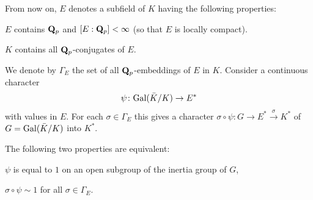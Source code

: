 
From now on, $E$ denotes a subfield of $K$ having the following
properties:
\begin{alist}
\item $E$ contains $\mathbf{Q}_p$ and $[E:\mathbf{Q}_p]<\infty$ (so that $E$ is locally
compact).
\item $K$ contains all $\mathbf{Q}_p$-conjugates of $E$.
\end{alist}
We denote by $\Gamma_E$ the set of all $\mathbf{Q}_p$-embeddings of $E$ in $K$.
Consider a continuous character
\[
\psi\colon\mathrm{Gal}(\bar K/K)\to E^*
\]
with values in $E$.  For each $\sigma\in\Gamma_E$ this gives a
character $\sigma\circ\psi\colon G\to E^*\xrightarrow{\ \sigma\ } K^*$
of $G=\mathrm{Gal}(\bar K/K)$ into $K^*$.

\begin{proposition}[3]\label{prop:III.A.3.3}
The following two properties are equivalent:
\begin{nlist}
\item[\emph{(1)}] $\psi$ is equal to $1$ on an open subgroup of the
inertia group of $G$,
\item[\emph{(2)}] $\sigma\circ\psi\sim 1$ for all $\sigma\in\Gamma_E$.
\end{nlist}
\end{proposition}

